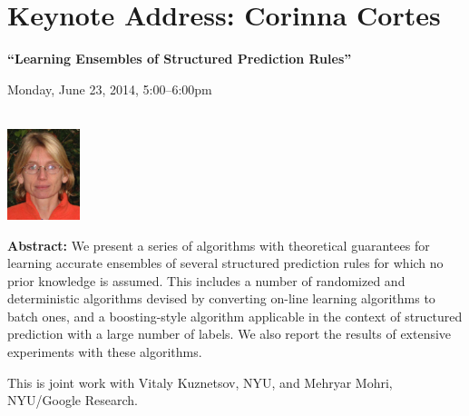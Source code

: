 \section{Keynote Address: Corinna Cortes}

\begin{center}

\begin{Large}
{\bfseries\Large ``Learning Ensembles of Structured Prediction Rules''}\vspace{1em}\par
\end{Large}


Monday, June 23, 2014, 5:00--6:00pm \vspace{1em}\\
\PlenaryLoc \\
\vspace{1em}\par
\includegraphics[height=100px]{content/monday/cortes-headshot.png}
\end{center}

\noindent
{\bfseries Abstract:} We present a series of algorithms with
theoretical guarantees for learning accurate ensembles of several
structured prediction rules for which no prior knowledge is assumed.
This includes a number of randomized and deterministic algorithms
devised by converting on-line learning algorithms to batch ones, and a
boosting-style algorithm applicable in the context of structured
prediction with a large number of labels. We also report the results
of extensive experiments with these algorithms.

This is joint work with Vitaly Kuznetsov, NYU, and Mehryar Mohri, NYU/Google
Research.

